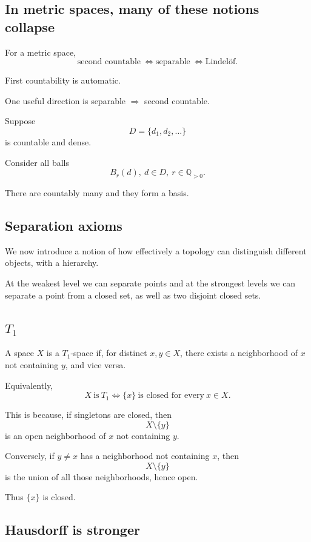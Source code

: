 \documentclass[11pt]{article}
\begin{document}
\subsection{In metric spaces, many of these notions collapse}

For a metric space, 
\[
    \text{second countable} 
    \ \Leftrightarrow 
    \text{separable} 
    \ \Leftrightarrow 
    \text{Lindel{\"o}f}. 
\]

First countability is automatic. 

One useful direction is separable $\Rightarrow$ second 
countable. 

Suppose 
\[
    D = \{d_1,d_2,\ldots\}
\]
is countable and dense. 

Consider all balls 
\[
    B_r(d), \ d \in D, \ r \in \mathbb Q_{>0}. 
\]

There are countably many and they form a basis.

\subsection{Separation axioms}

We now introduce a notion of how 
effectively a topology can distinguish different 
objects, with a hierarchy. 

At the weakest level we can separate points and 
at the strongest levels we can separate 
a point from a closed set, as well as two disjoint 
closed sets. 

\subsection{$T_1$}

A space $X$ is a $T_1$-space if, for distinct 
$x,y \in X$, there exists a neighborhood of 
$x$ not containing $y$, and vice versa. 

Equivalently, 
\[  
    X \ \text{is} \ T_1 \Leftrightarrow 
    \{x\} \ \text{is closed for every} \ x \in X. 
\]

This is because, if 
singletons are closed, then 
\[
    X \setminus \{y\}
\]
is an open neighborhood of $x$ not containing $y$. 

Conversely, if $y \neq x$ has a neighborhood 
not containing $x$, then 
\[
    X \setminus \{y\}
\]
is the union of all those neighborhoods, hence 
open. 

Thus $\{x\}$ is closed. 

\subsection{Hausdorff is stronger}
\end{document}
